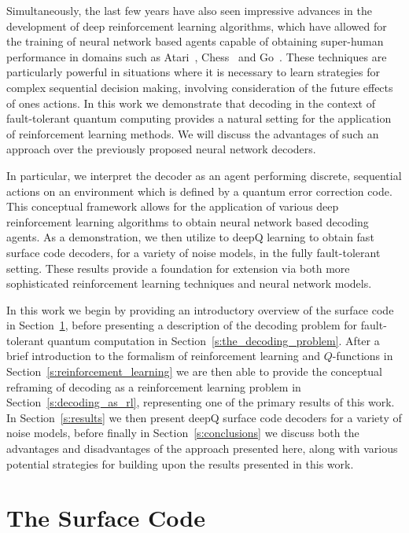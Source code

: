 \documentclass[twocolumn,preprintnumbers,amsmath,amssymb,notitlepage,nofootinbib,longbibliography,superscriptaddress,aps,pra,10pt]{revtex4-1}
\begin{document}
	Simultaneously, the last few years have also seen impressive advances in the development of deep reinforcement learning algorithms, which have allowed for the training of neural network based agents capable of obtaining super-human performance in domains such as Atari~\cite{RLMnih15,RLschaul2015prioritized,RLvan2016deep,RLwang2015dueling}, Chess~\cite{RLsilver2017mastering} and Go~\cite{RLSilver2016,RLSilver17b}.
	These techniques are particularly powerful in situations where it is necessary to learn strategies for complex sequential decision making, involving consideration of the future effects of ones actions.
	In this work we demonstrate that decoding in the context of fault-tolerant quantum computing provides a natural setting for the application of reinforcement learning methods.
	We will discuss the advantages of such an approach over the previously proposed neural network decoders.

	In particular, we interpret the decoder as an agent performing discrete, sequential actions on an environment which is defined by a quantum error correction code.
	This conceptual framework allows for the application of various deep reinforcement learning algorithms to obtain neural network based decoding agents.
	As a demonstration, we then utilize to deepQ learning to obtain fast surface code decoders, for a variety of noise models, in the fully fault-tolerant setting.
	These results provide a foundation for extension via both more sophisticated reinforcement learning techniques and neural network models.

	In this work we begin by providing an introductory overview of the surface code in Section~\ref{s:the_surface_code}, before presenting a description of the decoding problem for fault-tolerant quantum computation in Section~\ref{s:the_decoding_problem}.
	After a brief introduction to the formalism of reinforcement learning and $Q$-functions in Section~\ref{s:reinforcement_learning} we are then able to provide the conceptual reframing of decoding as a reinforcement learning problem in Section~\ref{s:decoding_as_rl}, representing one of the primary results of this work.
	In Section~\ref{s:results} we then present deepQ surface code decoders for a variety of noise models, before finally in Section~\ref{s:conclusions} we discuss both the advantages and disadvantages of the approach presented here, along with various potential strategies for building upon the results presented in this work.

\section{The Surface Code}\label{s:the_surface_code}
\end{document}

